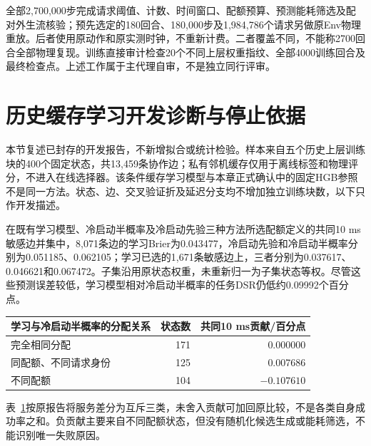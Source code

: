 全部2,700,000步完成请求阈值、计数、时间窗口、配额预算、预测能耗筛选及配对外生流核验；预先选定的180回合、180,000步及1,984,786个请求另做原Env物理重放。后者使用原动作和原实测时钟，不重新计费。二者覆盖不同，不能称2700回合全部物理复现。训练直接审计检查20个不同上层权重指纹、全部4000训练回合及最终检查点。上述工作属于主代理自审，不是独立同行评审。

\section{历史缓存学习开发诊断与停止依据}
\label{sec:cost-development-diagnostics}
本节复述已封存的开发报告，不新增拟合或统计检验。样本来自五个历史上层训练块的400个固定状态，共13,459条协作边；私有邻机缓存仅用于离线标签和物理评分，不进入在线选择器。该条件缓存学习模型与本章正式确认中的固定HGB参照不是同一方法。状态、边、交叉验证折及延迟分支均不增加独立训练块数，以下只作开发描述。

在既有学习模型、冷启动半概率及冷启动先验三种方法所选配额定义的共同10 ms敏感边并集中，8,071条边的学习Brier为0.043477，冷启动先验和冷启动半概率分别为0.051185、0.062105；学习已选的1,671条敏感边上，三者分别为0.037617、0.046621和0.067472。子集沿用原状态权重，未重新归一为子集状态等权。尽管这些预测误差较低，学习模型相对冷启动半概率的任务DSR仍低约0.09992个百分点。

\begin{table}[!htbp]
\centering
{}
\label{tab:cost-development-decomposition}
\small
\begin{tabular}{lrr}
\toprule
学习与冷启动半概率的分配关系 & 状态数 & 共同10 ms贡献/百分点\\
\midrule
完全相同分配 & 171 & 0.000000\\
同配额、不同请求身份 & 125 & 0.007686\\
不同配额 & 104 & $-0.107610$\\
\bottomrule
\end{tabular}
\end{table}

表~\ref{tab:cost-development-decomposition}按原报告将服务差分为互斥三类，未舍入贡献可加回原比较，不是各类自身成功率之和。负贡献主要来自不同配额状态，但没有随机化候选生成或能耗筛选，不能识别唯一失败原因。

